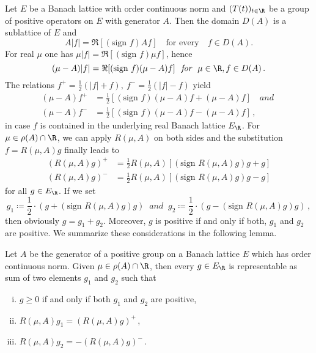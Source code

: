 Let $E$ be a Banach lattice with order continuous norm and $(T(t))_{t \in \R }$
be a group of positive operators on $E$ with generator $A$.
Then the domain $D(A)$ is a sublattice of $E$ and
\begin{equation}\label{eq:c3-4.8}
	A|f| = \Re [(\text{sign } f)Af] \quad \text{for every} \quad f \in D(A) .
\end{equation}
For real $\mu$ one has $\mu|f| = \Re [(\text{sign } f)\mu f]$, hence
\[
(\mu - A)|f| = \Re[(\text{sign } f)(\mu - A)f] \ \textit{ for } \ \mu \in \R , f \in D(A)\,.
\]
The relations $f^+ = \frac{1}{2}(|f| + f), \ f^- = \frac{1}{2}(|f| - f)$ yield
\begin{align*}
(\mu - A)f^+ &= \frac{1}{2}[(\text{sign } f)(\mu - A)f + (\mu - A)f] \quad\textit{and }\\
(\mu - A)f^- &= \frac{1}{2}[(\text{sign } f)(\mu - A)f - (\mu - A)f]\,,
\end{align*}
in case $f$ is contained in the underlying real Banach lattice $E_{\R }$.
For $\mu \in \rho(A) \cap \R $, we can apply $R(\mu,A)$ on both sides and the substitution $f = R(\mu,A)g$ finally leads to
\begin{equation}\label{eq:c3-4.9}
	\begin{aligned}
	(R(\mu,A)g)^+ &= \frac{1}{2}R(\mu,A) [(\text{sign } R(\mu,A)g)g + g] \\
	(R(\mu,A)g)^- &= \frac{1}{2}R(\mu,A) [(\text{sign } R(\mu,A)g)g - g]
	\end{aligned}
\end{equation}
for all $g \in E_{\R }$. If we set 
\[ 
g_1 \coloneqq \frac{1}{2}\cdot(g + (\text{sign } R(\mu,A)g)g) \ \textit{ and } \ 
g_2 \coloneqq \frac{1}{2}\cdot(g - (\text{sign } R(\mu,A)g)g)\,,
\]
then obviously $g = g_1 + g_2$. Moreover, $g$ is positive if and only if
both, $g_1$ and $g_2$ are positive. We summarize these considerations in
the following lemma.
%
%
\begin{lemma}\label{lem:c3-4.6}
Let $A$ be the generator of a positive group on a Banach
lattice $E$ which has order continuous norm. Given $\mu \in \rho(A) \cap \R $, then
every $g \in E_{\R }$ is representable as sum of two elements $g_1$ and $g_2$
such that
\begin{enumerate}[(i)]
	\item 
	$g \geq 0$ if and only if both $g_1$ and $g_2$ are positive,
	
	\item
	$R(\mu,A)g_1 = (R(\mu,A)g)^+$\,,

	\item
	$R(\mu,A)g_2 = -(R(\mu,A)g)^-$\,.
\end{enumerate}	
\end{lemma}

